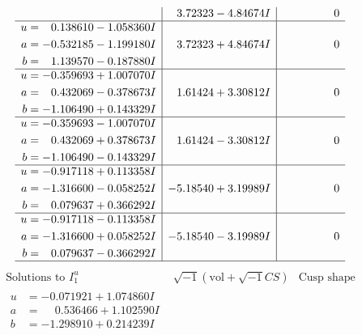 \documentclass[1p]{elsarticle_modified}
\theoremstyle{definition}
\newcommand{\I}{\sqrt{-1}}
\begin{document}
$$\begin{array}{c|c|c}
 & \phantom{-}3.72323 - 4.84674 I & \phantom{-0.000000 } 0 \\ \hline\begin{aligned}
u &= \phantom{-}0.138610 - 1.058360 I \\
a &= -0.532185 - 1.199180 I \\
b &= \phantom{-}1.139570 - 0.187880 I\end{aligned}
 & \phantom{-}3.72323 + 4.84674 I & \phantom{-0.000000 } 0 \\ \hline\begin{aligned}
u &= -0.359693 + 1.007070 I \\
a &= \phantom{-}0.432069 - 0.378673 I \\
b &= -1.106490 + 0.143329 I\end{aligned}
 & \phantom{-}1.61424 + 3.30812 I & \phantom{-0.000000 } 0 \\ \hline\begin{aligned}
u &= -0.359693 - 1.007070 I \\
a &= \phantom{-}0.432069 + 0.378673 I \\
b &= -1.106490 - 0.143329 I\end{aligned}
 & \phantom{-}1.61424 - 3.30812 I & \phantom{-0.000000 } 0 \\ \hline\begin{aligned}
u &= -0.917118 + 0.113358 I \\
a &= -1.316600 - 0.058252 I \\
b &= \phantom{-}0.079637 + 0.366292 I\end{aligned}
 & -5.18540 + 3.19989 I & \phantom{-0.000000 } 0 \\ \hline\begin{aligned}
u &= -0.917118 - 0.113358 I \\
a &= -1.316600 + 0.058252 I \\
b &= \phantom{-}0.079637 - 0.366292 I\end{aligned}
 & -5.18540 - 3.19989 I & \phantom{-0.000000 } 0\\
 \hline 
 \end{array}$$\newpage$$\begin{array}{c|c|c}  
\text{Solutions to }I^u_{1}& \I (\text{vol} + \sqrt{-1}CS) & \text{Cusp shape}\\
 \hline 
\begin{aligned}
u &= -0.071921 + 1.074860 I \\
a &= \phantom{-}0.536466 + 1.102590 I \\
b &= -1.298910 + 0.214239 I\end{aligned}

\end{array}$$
\end{document}

